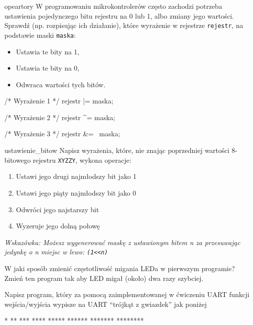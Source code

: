 \documentclass{pdfBooklets}
\begin{document}
\begin{Zadanie}{}{opeartory}
  W programowaniu mikrokontrolerów często zachodzi potrzeba ustawienia pojedynczego bitu rejestru na 0 lub 1, albo zmiany jego wartości.
  Sprawdź (np. rozpisując ich działanie), które wyrażenie w rejestrze \Verb$rejestr$, na podstawie maski \Verb$maska$:
  \begin{itemize}
  \item Ustawia te bity na 1,
  \item Ustawia te bity na 0,
  \item Odwraca wartości tych bitów.
  \end{itemize}

  \begin{CodeFrame*}[c]{}
    /* Wyrażenie 1 */
    rejestr |= maska;

    /* Wyrażenie 2 */
    rejestr ^= maska;

    /* Wyrażenie 3 */
    rejestr &= ~maska;
    \end{CodeFrame*}
\end{Zadanie}

\begin{Zadanie}{}{ustawienie_bitow}
  Napisz wyrażenia, które, nie znając poprzedniej wartości 8-bitowego rejestru \Verb$XYZZY$, wykona operacje:
  \begin{enumerate}
  \item Ustawi jego drugi najmłodszy bit jako 1
  \item Ustawi jego piąty najmłodszy bit jako 0
  \item Odwróci jego najstarszy bit
  \item Wyzeruje jego dolną połowę
  \end{enumerate}
  \textit{Wskazówka: Możesz wygenerować maskę z ustawionym bitem n za przesuwając jedynkę o n miejsc w lewo: \Verb$(1<<n)$}
\end{Zadanie}

\begin{Zadanie}{}
W jaki sposób zmienić częstotliwość migania LEDa w pierwszym programie? Zmień ten program tak aby LED migał (około) dwa razy szybciej.
\end{Zadanie}

\begin{Zadanie}{}
Napisz program, który za pomocą zaimplementowanej w ćwiczeniu UART funkcji wejścia/wyjścia wypisze na UART
``trójkąt z gwiazdek'' jak poniżej

\begin{CodeFrame*}[text]{}
*
**
***
****
*****
******
*******
********
\end{CodeFrame*}
\end{Zadanie}
\end{document}
